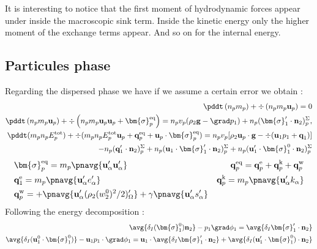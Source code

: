 It is interesting to notice that the first moment of hydrodynamic forces appear under inside the macroscopic sink term. 
Inside the kinetic energy only the higher moment of the exchange terms appear. 
And so on for the internal energy. 


\subsection*{Particules phase}
Regarding the dispersed phase we have  if we assume a certain error we obtain :
\begin{align*}
    \pddt \left(n_p m_p\right)
    + \div \left(n_pm_p\textbf{u}_p
    \right)
    = 
    0\\
    \pddt \left(n_p m_p \textbf{u}_p\right)
    + \div \left(n_p
    m_p \textbf{u}_p \textbf{u}_p 
    + \bm{\sigma}_p^\text{eq}
    \right)
    = 
    n_p v_p (\rho_2 \textbf{g}
    - \grad p_1)
    + n_p (\bm{\sigma}_1' \cdot \textbf{n}_2)_p^\Sigma,\\
    \pddt(m_p n_pE_p^\text{tot})
    + \div(m_pn_p E_p^\text{tot} \textbf{u}_p 
    + \textbf{q}_p^\text{eq} 
    + \textbf{u}_p \cdot \bm{\sigma}_p^\text{eq})
    =  n_p v_p [\rho_2 \textbf{u}_p\cdot  \textbf{g}
    - \div (\textbf{u}_1 p_1 + \textbf{q}_1)]\\
    -  n_p (\textbf{q}_1' \cdot \textbf{n}_2)_p^\Sigma
    +  n_p (\textbf{u}_1 \cdot \bm{\sigma}_1' \cdot \textbf{n}_2)_p^\Sigma
    +  n_p (\textbf{u}_1' \cdot \bm{\sigma}_1^0\cdot \textbf{n}_2)_p^\Sigma
\end{align*}
\begin{align*}
    &\bm{\sigma}_p^\text{eq}
    = m_p\pnavg{\textbf{u}_\alpha'\textbf{u}_\alpha'}
    &\textbf{q}_p^\text{eq}
    =\textbf{q}_p^\text{e} 
    +\textbf{q}_p^\text{k}  
    +\textbf{q}_p^\text{w}  
    \\
    &\textbf{q}_1^\text{e}
    = m_p \pnavg{\textbf{u}_\alpha' e_\alpha'} 
    &\textbf{q}_p^\text{k}
    = m_p \pnavg{\textbf{u}_\alpha' k_\alpha} 
    \\
    &\textbf{q}_p^\text{w}
    = 
    + \pnavg{\textbf{u}_\alpha'(\rho_2 (w^0_2)^2/2 )'_\Omega}
    + \gamma \pnavg{\textbf{u}_\alpha' s_\alpha'}
\end{align*}
Following the energy decomposition : 
\begin{align*}
    \avg{\delta_I (\bm{\sigma}_1^0 ) \textbf{n}_2} - p_1 \grad \phi_1
    = 
    \avg{\delta_I \bm{\sigma}_1'\cdot \textbf{n}_2}
    \\
    \avg{\delta_I (\textbf{u}_1^0 \cdot\bm{\sigma}_1^0 )} - \textbf{u}_1p_1\cdot \grad \phi_1
    = \textbf{u}_1 \cdot \avg{\delta_I \bm{\sigma}_1'\cdot \textbf{n}_2}
    + \avg{\delta_I (\textbf{u}_1' \cdot \bm{\sigma}_1^0 )\cdot \textbf{n}_2}
\end{align*}

